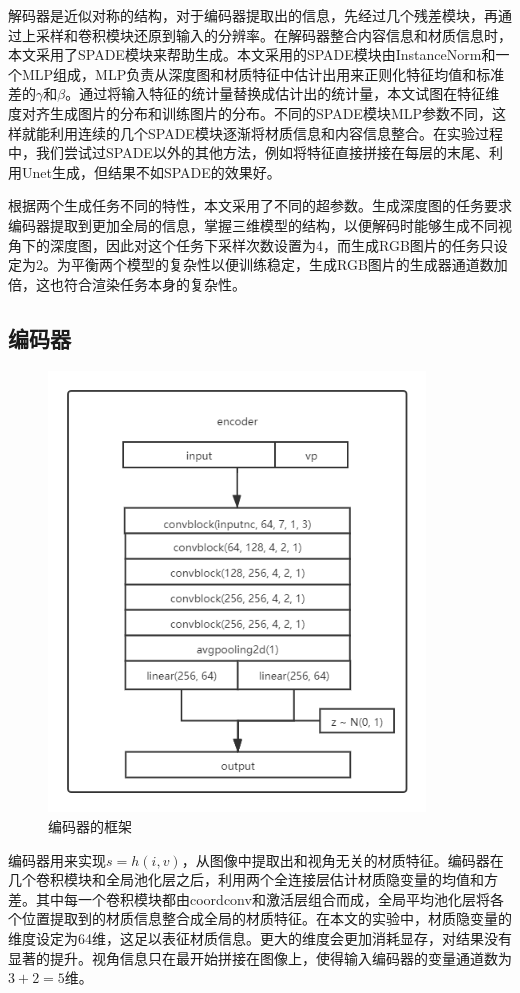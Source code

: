 \documentclass[UTF8,openany,AutoFakeBold,AutoFakeSlant,cs4size]{ctexbook}
\begin{document}
解码器是近似对称的结构，对于编码器提取出的信息，先经过几个残差模块，再通过上采样和卷积模块还原到输入的分辨率。在解码器整合内容信息和材质信息时，本文采用了SPADE模块来帮助生成。本文采用的SPADE模块由InstanceNorm\cite{Ulyanov2016InstanceNT}和一个MLP组成，MLP负责从深度图和材质特征中估计出用来正则化特征均值和标准差的$\gamma$和$\beta$。通过将输入特征的统计量替换成估计出的统计量，本文试图在特征维度对齐生成图片的分布和训练图片的分布。不同的SPADE模块MLP参数不同，这样就能利用连续的几个SPADE模块逐渐将材质信息和内容信息整合。在实验过程中，我们尝试过SPADE以外的其他方法，例如将特征直接拼接在每层的末尾、利用Unet生成，但结果不如SPADE的效果好。

根据两个生成任务不同的特性，本文采用了不同的超参数。生成深度图的任务要求编码器提取到更加全局的信息，掌握三维模型的结构，以便解码时能够生成不同视角下的深度图，因此对这个任务下采样次数设置为4，而生成RGB图片的任务只设定为2。为平衡两个模型的复杂性以便训练稳定，生成RGB图片的生成器通道数加倍，这也符合渲染任务本身的复杂性。


\subsection{编码器}

\begin{figure}
\centering
\includegraphics[width=10cm]{./images/encoder.png}
\caption{编码器的框架}
\label{fig:sample}
\end{figure}

编码器用来实现$s = h(i, v)$，从图像中提取出和视角无关的材质特征。编码器在几个卷积模块和全局池化层之后，利用两个全连接层估计材质隐变量的均值和方差。其中每一个卷积模块都由coordconv和激活层组合而成，全局平均池化层将各个位置提取到的材质信息整合成全局的材质特征。在本文的实验中，材质隐变量的维度设定为64维，这足以表征材质信息。更大的维度会更加消耗显存，对结果没有显著的提升。视角信息只在最开始拼接在图像上，使得输入编码器的变量通道数为$3 + 2 = 5$维。
\end{document}
